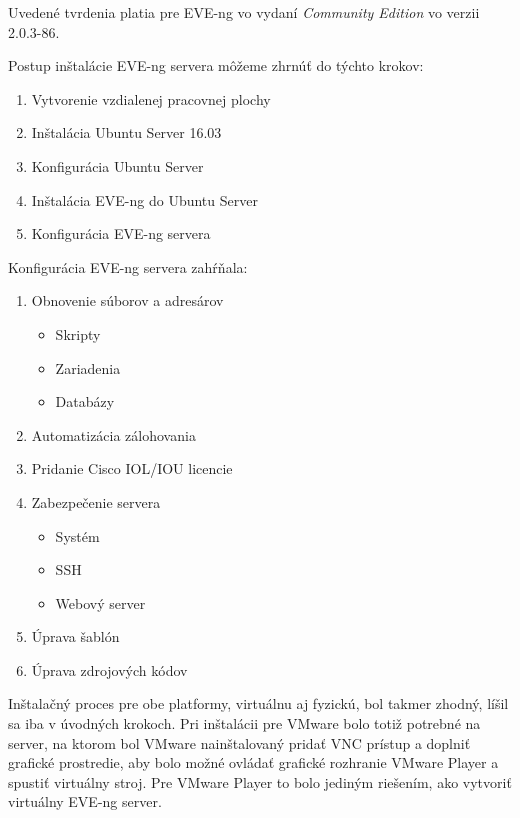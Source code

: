 \noindent
Uvedené tvrdenia platia pre EVE-ng vo vydaní \emph{Community Edition} vo verzii 2.0.3-86.

\noindent
Postup inštalácie EVE-ng servera môžeme zhrnúť do týchto krokov:

\begin{enumerate}[noitemsep]
    \item Vytvorenie vzdialenej pracovnej plochy
    \item Inštalácia Ubuntu Server 16.03
    \item Konfigurácia Ubuntu Server
    \item Inštalácia EVE-ng do Ubuntu Server
    \item Konfigurácia EVE-ng servera
\end{enumerate}

\noindent   
Konfigurácia EVE-ng servera zahŕňala:

\begin{enumerate}[noitemsep]
    \item Obnovenie súborov a adresárov
    \begin{itemize}[noitemsep]
        \item Skripty
        \item Zariadenia
        \item Databázy
    \end{itemize}
    \item Automatizácia zálohovania
    \item Pridanie Cisco IOL/IOU licencie
    \item Zabezpečenie servera
    \begin{itemize}[noitemsep]
        \item Systém
        \item SSH
        \item Webový server
    \end{itemize}
    \item Úprava šablón
    \item Úprava zdrojových kódov
\end{enumerate}

Inštalačný proces pre obe platformy, virtuálnu aj fyzickú, bol takmer zhodný, líšil sa iba v úvodných krokoch. Pri inštalácii pre VMware bolo totiž potrebné na server, na ktorom bol VMware nainštalovaný pridať VNC prístup a doplniť grafické prostredie, aby bolo možné ovládať grafické rozhranie VMware Player a spustiť virtuálny stroj. Pre VMware Player to bolo jediným riešením, ako vytvoriť virtuálny EVE-ng server.

